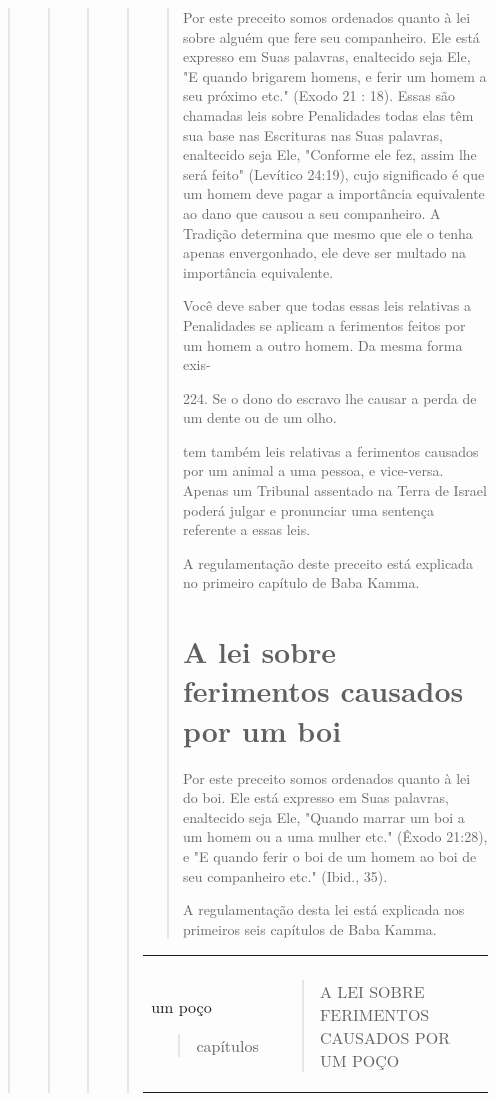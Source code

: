 \begin{quote}
\begin{quote}
\begin{quote}
\begin{quote}
\begin{quote}
Por este preceito somos ordenados quanto à lei sobre alguém que fere seu
companheiro. Ele está expresso em Suas palavras, enaltecido seja Ele, "E
quando brigarem homens, e ferir um homem a seu próximo etc." (Exodo 21 :
18). Essas são chamadas leis sobre Penalidades todas elas têm sua base
nas Escrituras nas Suas palavras, enaltecido seja Ele, "Conforme ele
fez, assim lhe será feito" (Levítico 24:19), cujo significado é que um
homem deve pagar a im­portância equivalente ao dano que causou a seu
companheiro. A Tradição de­termina que mesmo que ele o tenha apenas
envergonhado, ele deve ser multa­do na importância equivalente.

Você deve saber que todas essas leis relativas a Penalidades se apli­cam
a ferimentos feitos por um homem a outro homem. Da mesma forma exis-

224. Se o dono do escravo lhe causar a perda de um dente ou de um olho.



tem também leis relativas a ferimentos causados por um animal a uma
pessoa, e vice-versa. Apenas um Tribunal assentado na Terra de Israel
poderá julgar e pronunciar uma sentença referente a essas leis.

A regulamentação deste preceito está explicada no primeiro capítu­lo de
Baba Kamma.

\section{A lei sobre ferimentos causados por um boi}

Por este preceito somos ordenados quanto à lei do boi. Ele está
ex­presso em Suas palavras, enaltecido seja Ele, "Quando marrar um boi a
um ho­mem ou a uma mulher etc." (Êxodo 21:28), e "E quando ferir o boi
de um ho­mem ao boi de seu companheiro etc." (Ibid., 35).

A regulamentação desta lei está explicada nos primeiros seis capítu­los
de Baba Kamma.
\end{quote}

\begin{longtable}[]{@{}ll@{}}
\toprule
\endhead
\begin{minipage}[t]{0.47\columnwidth}\raggedright
\begin{quote}
238
\end{quote}

expresso\\
um poço

\begin{quote}
capítulos
\end{quote}\strut
\end{minipage} & \begin{minipage}[t]{0.47\columnwidth}\raggedright
\begin{quote}
A LEI SOBRE FERIMENTOS CAUSADOS POR UM POÇO


\end{quote}
\end{minipage}
\end{longtable}
\end{quote}
\end{quote}
\end{quote}
\end{quote}
